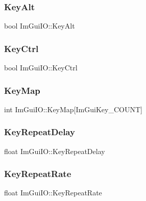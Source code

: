 \hypertarget{struct_im_gui_i_o_a1e64ef08a4448a2cac874496130992cb}{}\label{struct_im_gui_i_o_a1e64ef08a4448a2cac874496130992cb} 
\subsubsection{\texorpdfstring{Key\+Alt}{KeyAlt}}
{\footnotesize\ttfamily bool Im\+Gui\+I\+O\+::\+Key\+Alt}

\hypertarget{struct_im_gui_i_o_a51de8f65dcabb80ef4e0d3c759ffcd7f}{}\label{struct_im_gui_i_o_a51de8f65dcabb80ef4e0d3c759ffcd7f} 
\subsubsection{\texorpdfstring{Key\+Ctrl}{KeyCtrl}}
{\footnotesize\ttfamily bool Im\+Gui\+I\+O\+::\+Key\+Ctrl}

\hypertarget{struct_im_gui_i_o_aa1cd0083960f8e5361eb6d49973c8823}{}\label{struct_im_gui_i_o_aa1cd0083960f8e5361eb6d49973c8823} 
\subsubsection{\texorpdfstring{Key\+Map}{KeyMap}}
{\footnotesize\ttfamily int Im\+Gui\+I\+O\+::\+Key\+Map\mbox{[}Im\+Gui\+Key\+\_\+\+C\+O\+U\+NT\mbox{]}}

\hypertarget{struct_im_gui_i_o_a390537e7cba21b98a8f89df857ea59fb}{}\label{struct_im_gui_i_o_a390537e7cba21b98a8f89df857ea59fb} 
\subsubsection{\texorpdfstring{Key\+Repeat\+Delay}{KeyRepeatDelay}}
{\footnotesize\ttfamily float Im\+Gui\+I\+O\+::\+Key\+Repeat\+Delay}

\hypertarget{struct_im_gui_i_o_accd71987c895c4aec6d1a8c368cc9e0e}{}\label{struct_im_gui_i_o_accd71987c895c4aec6d1a8c368cc9e0e} 
\subsubsection{\texorpdfstring{Key\+Repeat\+Rate}{KeyRepeatRate}}
{\footnotesize\ttfamily float Im\+Gui\+I\+O\+::\+Key\+Repeat\+Rate}

